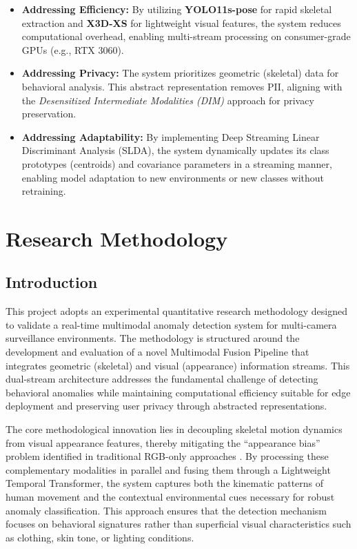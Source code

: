 \documentclass[12pt]{article}
\begin{document}
\begin{itemize}
    \item \textbf{Addressing Efficiency:} By utilizing \textbf{YOLO11s-pose} for rapid skeletal extraction and \textbf{X3D-XS} for lightweight visual features, the system reduces computational overhead, enabling multi-stream processing on consumer-grade GPUs (e.g., RTX 3060).
    
    \item \textbf{Addressing Privacy:} The system prioritizes geometric (skeletal) data for behavioral analysis. This abstract representation removes PII, aligning with the \textit{Desensitized Intermediate Modalities (DIM)} approach for privacy preservation.
    
    \item \textbf{Addressing Adaptability:} By implementing Deep Streaming Linear Discriminant Analysis (SLDA), the system dynamically updates its class prototypes (centroids) and covariance parameters in a streaming manner, enabling model adaptation to new environments or new classes without retraining.
\end{itemize}

\clearpage
\section{Research Methodology}

\subsection{Introduction}
This project adopts an experimental quantitative research methodology designed to validate a real-time multimodal anomaly detection system for multi-camera surveillance environments. The methodology is structured around the development and evaluation of a novel Multimodal Fusion Pipeline that integrates geometric (skeletal) and visual (appearance) information streams. This dual-stream architecture addresses the fundamental challenge of detecting behavioral anomalies while maintaining computational efficiency suitable for edge deployment and preserving user privacy through abstracted representations.

The core methodological innovation lies in decoupling skeletal motion dynamics from visual appearance features, thereby mitigating the ``appearance bias'' problem identified in traditional RGB-only approaches \citep{liu2025privacy}. By processing these complementary modalities in parallel and fusing them through a Lightweight Temporal Transformer, the system captures both the kinematic patterns of human movement and the contextual environmental cues necessary for robust anomaly classification. This approach ensures that the detection mechanism focuses on behavioral signatures rather than superficial visual characteristics such as clothing, skin tone, or lighting conditions.
\end{document}
